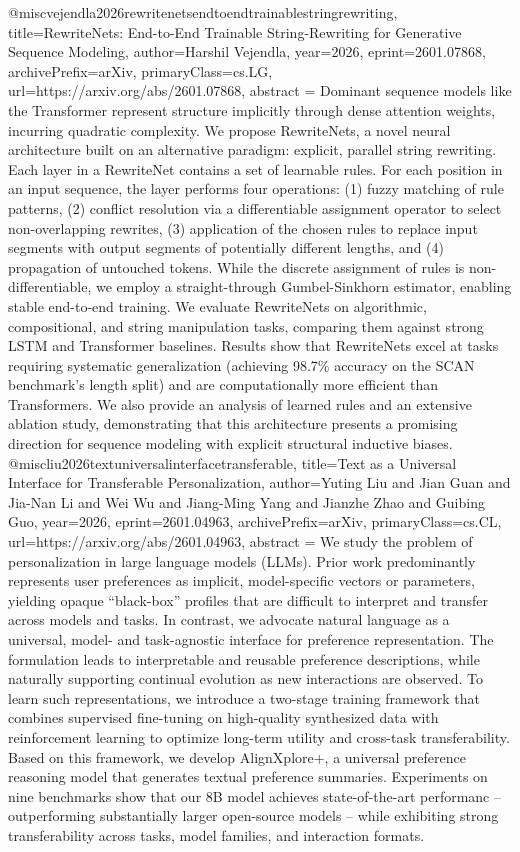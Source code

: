 {}@misc{vejendla2026rewritenetsendtoendtrainablestringrewriting,
      title={RewriteNets: End-to-End Trainable String-Rewriting for Generative Sequence Modeling}, 
      author={Harshil Vejendla},
      year={2026},
      eprint={2601.07868},
      archivePrefix={arXiv},
      primaryClass={cs.LG},
      url={https://arxiv.org/abs/2601.07868},
      abstract = {Dominant sequence models like the Transformer represent structure implicitly through dense attention weights, incurring quadratic complexity. We propose RewriteNets, a novel neural architecture built on an alternative paradigm: explicit, parallel string rewriting. Each layer in a RewriteNet contains a set of learnable rules. For each position in an input sequence, the layer performs four operations: (1) fuzzy matching of rule patterns, (2) conflict resolution via a differentiable assignment operator to select non-overlapping rewrites, (3) application of the chosen rules to replace input segments with output segments of potentially different lengths, and (4) propagation of untouched tokens. While the discrete assignment of rules is non-differentiable, we employ a straight-through Gumbel-Sinkhorn estimator, enabling stable end-to-end training. We evaluate RewriteNets on algorithmic, compositional, and string manipulation tasks, comparing them against strong LSTM and Transformer baselines. Results show that RewriteNets excel at tasks requiring systematic generalization (achieving 98.7\% accuracy on the SCAN benchmark's length split) and are computationally more efficient than Transformers. We also provide an analysis of learned rules and an extensive ablation study, demonstrating that this architecture presents a promising direction for sequence modeling with explicit structural inductive biases.}
}@misc{liu2026textuniversalinterfacetransferable,
      title={Text as a Universal Interface for Transferable Personalization}, 
      author={Yuting Liu and Jian Guan and Jia-Nan Li and Wei Wu and Jiang-Ming Yang and Jianzhe Zhao and Guibing Guo},
      year={2026},
      eprint={2601.04963},
      archivePrefix={arXiv},
      primaryClass={cs.CL},
      url={https://arxiv.org/abs/2601.04963},
      abstract = {We study the problem of personalization in large language models (LLMs). Prior work predominantly represents user preferences as implicit, model-specific vectors or parameters, yielding opaque ``black-box'' profiles that are difficult to interpret and transfer across models and tasks. In contrast, we advocate natural language as a universal, model- and task-agnostic interface for preference representation. The formulation leads to interpretable and reusable preference descriptions, while naturally supporting continual evolution as new interactions are observed. To learn such representations, we introduce a two-stage training framework that combines supervised fine-tuning on high-quality synthesized data with reinforcement learning to optimize long-term utility and cross-task transferability. Based on this framework, we develop AlignXplore+, a universal preference reasoning model that generates textual preference summaries. Experiments on nine benchmarks show that our 8B model achieves state-of-the-art performanc -- outperforming substantially larger open-source models -- while exhibiting strong transferability across tasks, model families, and interaction formats.}
}
